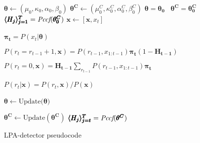 \begin{algorithm}
\label{alg:pccf_detector}
\begin{algorithmic}[1]
  \State $\pmb{\theta} \leftarrow (\mu_0, \kappa_0, \alpha_0, \beta_0)$
  \State $\pmb{\theta^C} \leftarrow (\mu^C_0, \kappa^C_0, \alpha^C_0, \beta^C_0)$
  \State $\pmb{\theta} = \pmb{\theta_0}$~
  \State $\pmb{\theta^C} = \pmb{\theta_0^C}$~
  \State $\pmb{\langle H_j \rangle_{j=1}^{T}} = \textit{Pccf}(\pmb{\theta_0^C})$ 
  \State $\pmb{x} \leftarrow [\pmb{x}, x_t]$

  \State $\pmb{\pi_t} = P(x_t | \pmb{\theta})$~

  \State $P(r_t=r_{t-1}+1, \pmb{x}) = P(r_{t-1}, x_{1:t-1}) \pmb{\pi_t} (1-\pmb{H_{t-1}})$ %

  \State $P(r_t = 0, \pmb{x}) = \pmb{H_{t-1}} \sum_{r_{t-1}} P(r_{t-1}, x_{1:t-1}) \pmb{\pi_t} $ %

  \State $P(r_t | \pmb{x}) = P(r_t, \pmb{x}) / P(\pmb{x})$~

  \State $\pmb{\theta} \leftarrow \text{Update}(\pmb{\theta)}$~
  
  \State $\pmb{\theta^C} \leftarrow \text{Update}(\pmb{\theta^C})$ %
  \State $\pmb{\langle H_j \rangle_{j=t}^T} = \textit{Pccf}(\pmb{\theta^C})$ %
  \EndIf
  
  \EndFor

\end{algorithmic}
\caption{LPA-detector pseudocode}
\end{algorithm}


